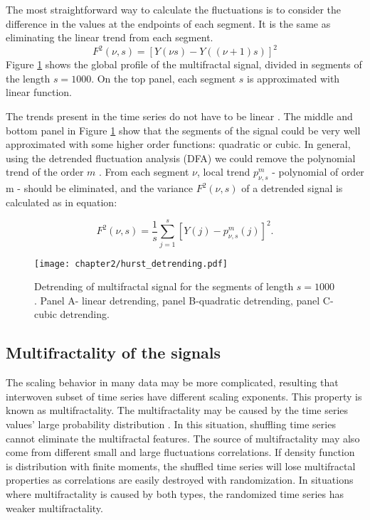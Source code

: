
{The most straightforward way to calculate the fluctuations is to consider the difference in the values at the endpoints of each segment. It is the same as eliminating the linear trend from each segment.  
$$ F^2(\nu, s) = [Y(\nu s) - Y((\nu +1)s)]^2$$ 
Figure \ref{fig:hurst_detrending} shows the global profile of the multifractal signal, divided in segments of the length $s=1000$. On the top panel, each segment $s$ is approximated with linear function.
	}
	
 The trends present in the time series do not have to be linear \cite{hu2001effect}. The middle and bottom panel in Figure \ref{fig:hurst_detrending} show that the segments of the signal could be very well approximated with some higher order functions: quadratic or cubic. In general, using the detrended fluctuation analysis (DFA) we could remove the polynomial trend of the order $m$ \cite{kantelhardt2001detecting}. From each segment $\nu$, local trend $p^m_{\nu, s}$ - polynomial of order m - should be eliminated, and the variance $F^2(\nu, s)$ of a detrended signal is calculated as in equation:
	
	\begin{equation}
	F^2(\nu, s) = \frac{1}{s}\sum_{j=1}^s \left[Y(j) - p^m_{\nu, s}(j)\right]^2.
	\label{eq:var}
	\end{equation}

\begin{figure}[h]
	\centering
	\texttt{[image: chapter2/hurst\_detrending.pdf]}
	\caption[Detrending multifractal signal.]{Detrending of multifractal signal for the segments of length $s=1000$. Panel A- linear detrending, panel B-quadratic detrending, panel C- cubic detrending. }
	\label{fig:hurst_detrending}
\end{figure}

\newpage
\clearpage

\subsection{Multifractality of the signals}

The scaling behavior in many data may be more complicated, resulting that interwoven subset of time series have different scaling exponents. This property is known as multifractality.  The multifractality may be caused by the time series values' large probability distribution \cite{kantelhardt2002, ihlen2012}. In this situation, shuffling time series cannot eliminate the multifractal features. The source of multifractality may also come from different small and large fluctuations correlations. If density function is distribution with finite moments, the shuffled time series will lose multifractal properties as correlations are easily destroyed with randomization. In situations where multifractality is caused by both types, the randomized time series has weaker multifractality. 
 
